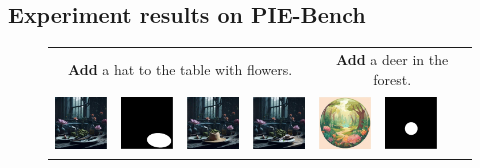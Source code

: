 \documentclass{article}
\begin{document}
\subsection{Experiment results on PIE-Bench}
\begin{figure}[h!]
\begin{tabular}{@{\hskip 1pt} p{\dimexpr\textwidth/9\relax}
                   @{\hskip 1pt} p{\dimexpr\textwidth/9\relax}
                   @{\hskip 1pt} p{\dimexpr\textwidth/9\relax}
                   @{\hskip 1pt} p{\dimexpr\textwidth/9\relax}
                   @{\hskip 10pt} p{\dimexpr\textwidth/9\relax}
                   @{\hskip 1pt} p{\dimexpr\textwidth/9\relax}
                   @{\hskip 1pt} p{\dimexpr\textwidth/9\relax}
                   @{\hskip 1pt} p{\dimexpr\textwidth/9\relax} @{}}

\multicolumn{4}{c}{\scriptsize \textbf{Add} a hat to the table with flowers.} & 
\multicolumn{4}{c}{\scriptsize \textbf{Add} a deer in the forest. }  \\
\includegraphics[width=\linewidth,  height=1.5cm]{figures/f3/1_1.jpg} &
\includegraphics[width=\linewidth,  height=1.5cm]{figures/f3/1_2.png} &
\includegraphics[width=\linewidth,  height=1.5cm]{figures/f3/1_3.jpg} &
\includegraphics[width=\linewidth,  height=1.5cm]{figures/f3/1_4.jpg} &
\includegraphics[width=\linewidth,  height=1.5cm]{figures/f3/2_1.jpg} &
\includegraphics[width=\linewidth,  height=1.5cm]{figures/f3/2_2.png} &

\end{tabular}
\end{figure}
\end{document}
